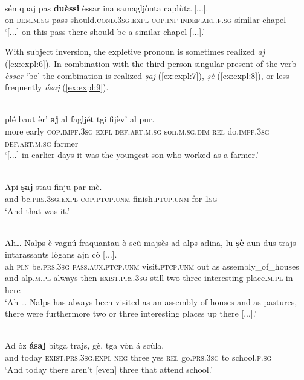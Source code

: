 \ea\label{ex:expl:5}
\\ 
\gll  [...] sén quaj pas \textbf{duèssi} èssar ina samagljònta caplùta [...].\\
{} on \textsc{dem.m.sg} pass should.\textsc{cond.3sg.expl} \textsc{cop.inf} \textsc{indef.art.f.sg} similar chapel\\
\glt `[...] on this pass there should be a similar chapel [...].'
\z

With subject inversion, the expletive pronoun is sometimes realized \textit{aj} (\ref{ex:expl:6}). In combination with the third person singular present of the verb \textit{èssar} `be' the combination is realized \textit{ṣaj} (\ref{ex:expl:7}), \textit{ṣè} (\ref{ex:expl:8}), or less frequently \textit{ásaj} (\ref{ex:expl:9}).

\ea\label{ex:expl:6}
\\ 
\gll  [...] plé baut èr’ \textbf{aj} al fagljét tgi fijèv’ al pur.  \\
{} more early \textsc{cop.impf.3sg} \textsc{expl} \textsc{def.art.m.sg}  son.\textsc{m.sg.dim} \textsc{rel} do.\textsc{impf.3sg} \textsc{def.art.m.sg} farmer \\
\glt `[...] in earlier days it was the youngest son who worked as a farmer.'
\z

\ea
\label{ex:expl:7}
\\ 
\gll  Api \textbf{ṣaj} stau finju par mè.\\
and be.\textsc{prs.3sg.expl} \textsc{cop.ptcp.unm} finish.\textsc{ptcp.unm} for \textsc{1sg}\\
\glt `And that was it.'
\z

\ea
\label{ex:expl:8}
\\
\gll Ah… Nalps è vagnú fraquantau ò scù majṣès ad alps adina, lu \textbf{ṣè} aun dus trajs intarassants lògans ajn cò [...].\\
ah  \textsc{pln}  be.\textsc{prs.3sg} \textsc{pass.aux.ptcp.unm} visit.\textsc{ptcp.unm} out as assembly\_of\_houses and alp.\textsc{m.pl} always then \textsc{exist.prs.3sg} still two three interesting place.\textsc{m.pl} in here \\
\glt `Ah … Nalps has always been visited as an assembly of houses and as pastures, there were furthermore two or three interesting places up there [...].'
\z

\ea
\label{ex:expl:9}
\\
\gll    Ad òz \textbf{ásaj} bitga trajs, gè, tga vòn á scùla.\\
and today \textsc{exist.prs.3sg.expl} \textsc{neg} three yes \textsc{rel} go.\textsc{prs.3sg} to school.\textsc{f.sg}\\
\glt `And today there aren’t [even] three that attend school.'
\z


